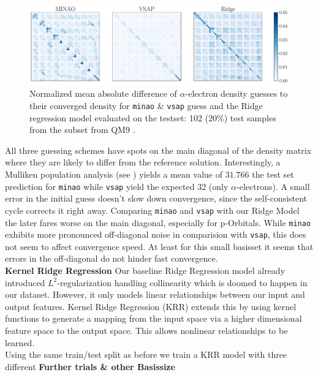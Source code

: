 \begin{figure}[H]
    \centering
    \includegraphics[width=\textwidth]{../fig/c5h4n2o2/density_error_comparison.pdf}
    \caption[Normalized difference of density guesses]{Normalized mean absolute difference of $\alpha$-electron density guesses to their converged density for \texttt{minao} \& \texttt{vsap} guess and the Ridge regression model evaluated on the testset: 102 (20\%) test samples from the  subset from QM9 \parencite{ref:article1_qm9}.}
    \label{fig:density_error_comparison}
\end{figure}
All three guessing schemes have spots on the main diagonal of the density matrix where they are likely to differ from the reference solution. Interestingly, a Mulliken population analysis (see ) \parencite{ref:Mulliken_population_analysis} yields a mean value of $31.766$ the test set prediction for \texttt{minao} while \texttt{vsap} yield the expected $32$ (only $\alpha$-electrons). A small error in the initial guess doesn't slow down convergence, since the self-consistent cycle corrects it right away. Comparing \texttt{minao} and \texttt{vsap} with our Ridge Model the later fares worse on the main diagonal, especially for p-Orbitals. While \texttt{minao} exhibits more pronounced off-diagonal noise in comparision with \texttt{vsap}, this does not seem to affect convergence speed. At least for this small basisset it seems that errors in the off-diagonal do not hinder fast convergence.\\

\textbf{Kernel Ridge Regression}
Our baseline Ridge Regression model already introduced $L^2$-regularization handling collinearity which is doomed to happen in our dataset. However, it only models linear relationships between our input and output features. Kernel Ridge Regression (KRR) extends this by using kernel functions to generate a mapping from the input space via a higher dimensional feature space to the output space. This allows nonlinear relationships to be learned. \\
Using the same train/test split as before we train a KRR model with three different 
\textbf{Further trials \& other Basissize}\\


